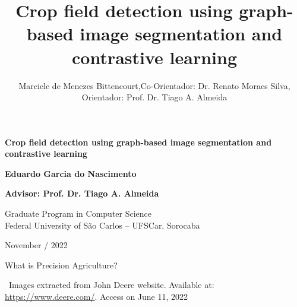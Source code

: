 \documentclass[xcolor=table]{beamer}
\title[Exame de Qualificação]{Crop field detection using graph-based image segmentation and contrastive learning}
\author[PPGCCS -- UFSCar]{Marciele de Menezes Bittencourt,Co-Orientador: Dr. Renato Moraes Silva, Orientador: Prof. Dr. Tiago A. Almeida}
\date{\footnotesize}
\begin{document}
\begin{frame}
	\begin{center}

	\vspace{0.3in}

	\Large \textbf{Crop field detection using graph-based image segmentation and contrastive learning}

	\vspace{0.2in}

	{\large \textbf{Eduardo Garcia do Nascimento}}

	\vspace{0.2in}
	{\normalsize \textbf{Advisor: Prof. Dr. Tiago A. Almeida}}

	\vspace{0.2in}
	{\small{ Graduate Program in Computer Science\\  [-0.1in]Federal University of São Carlos -- UFSCar, Sorocaba}}

	{\small November / 2022}

	\end{center}
\end{frame}

\begin{frame}{\normalsize What is Precision Agriculture?}
    \centering
	
    ~\flushright \tiny {Images extracted from John Deere website. Available at: \url{https://www.deere.com/}. Access on June 11, 2022}
	
\end{frame}
\end{document}
